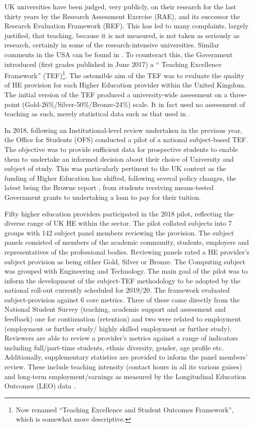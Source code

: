 \documentclass[sigconf,anonymous]{acmart}
\begin{document}
UK universities have been judged, very publicly, on their research
for the last thirty years by the Research Assessment Exercise (RAE), and its successor the Research Evaluation Framework (REF). This has led to many complaints, largely justified, that teaching, because it is not measured, is not taken as seriously as research, certainly in some of the research-intensive universities. Similar comments in the USA can be found in \cite{Campbelletal2018a}. To counteract this, the Government introduced (first grades published in June 2017) a `` Teaching Excellence Framework'' (TEF)\footnote{Now renamed ``Teaching Excellence and Student Outcomes Framework'', which is somewhat more descriptive.}. The ostensible aim of the TEF was to evaluate the quality of HE provision for each Higher Education provider within the United Kingdom.
The initial version of the TEF produced a university-wide assessment on a three-point (Gold-26\%/Silver-50\%/Bronze-24\%) scale. It in fact used no assessment of teaching as such, merely statistical data such as that used in \cite{Shadbolt2016a}.

In 2018, following an Institutional-level review undertaken in the previous year, the Office for Students (OFS) conducted a pilot of a national  subject-based TEF. The objective was to provide sufficient data for prospective students to enable them to undertake an informed decision about their choice of University and subject of study. This was particularly pertinent to the UK context as the funding of Higher Education has shifted, following several policy changes, the latest being the
Browne report \cite{BIS2010a}, from students receiving means-tested Government grants to undertaking a loan to pay for their tuition. %

Fifty higher education providers participated in the 2018 pilot, reflecting the diverse range of UK HE within the sector. The pilot collated subjects into 7 groups with 142 subject panel members reviewing the provision. The subject panels consisted of members of the academic community, students, employers and representatives of the professional bodies. Reviewing panels rated a HE provider's subject provision as being either Gold, Silver or Bronze. The Computing subject was grouped with Engineering and Technology. The main goal of the pilot was to inform the development of the subject-TEF methodology to be adopted by the national roll-out currently scheduled for 2019/20. The framework evaluated subject-provision against 6 core metrics. Three of these came directly from the National Student Survey (teaching, academic support and assessment and feedback) one for continuation (retention) and two were related to employment (employment or further study/ highly skilled employment or further study). Reviewers are able to review a provider's metrics against a range of indicators %
including full/part-time students, ethnic diversity, gender, age profile etc. Additionally, supplementary statistics are provided to inform the panel members' review. These include teaching intensity (contact hours in all its various guises) and long-term employment/earnings as measured by the Longitudinal Education Outcomes (LEO) data \cite{DfE2017a}.
\end{document}
